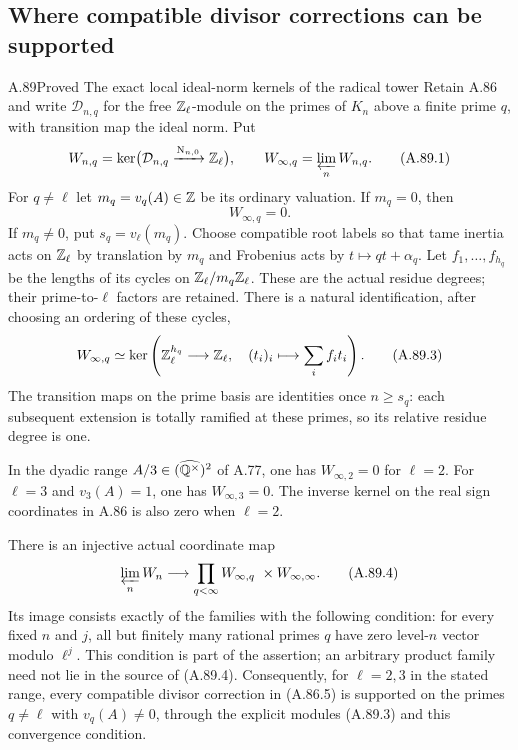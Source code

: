 \subsection{Where compatible divisor corrections can be supported}

\begin{statement}{A.89}{Proved}
{The exact local ideal-norm kernels of the radical tower}
Retain A.86 and write $\mathcal D_{n,q}$ for the free
$\mathbb Z_\ell$-module on the primes of $K_n$ above a finite prime
$q$, with transition map the ideal norm.  Put
\[
 W_{n,q}=\ker\bigl(\mathcal D_{n,q}
                                  \xrightarrow{\mathrm N_{n,0}}\mathbb Z_\ell\bigr),
 \qquad W_{\infty,q}=\varprojlim_n W_{n,q}.
 \tag{A.89.1}
\]
For $q\ne\ell$ let $m_q=v_q(A)\in\mathbb Z$ be its ordinary
valuation.  If $m_q=0$, then
\[
                                  W_{\infty,q}=0.
 \tag{A.89.2}
\]
If $m_q\ne0$, put $s_q=v_\ell(m_q)$.
Choose compatible root labels so that tame inertia acts
on $\mathbb Z_\ell$ by translation by $m_q$ and Frobenius acts
by $t\mapsto qt+\alpha_q$.
Let $f_1,\ldots,f_{h_q}$ be the lengths of its cycles on
$\mathbb Z_\ell/m_q\mathbb Z_\ell$.  These are the actual residue degrees;
their prime-to-$\ell$ factors are retained.  There is a natural
identification, after choosing an ordering of these cycles,
\[
 W_{\infty,q}\simeq
 \ker\left(\mathbb Z_\ell^{h_q}\longrightarrow\mathbb Z_\ell,
                      \quad(t_i)_i\longmapsto\sum_i f_i t_i\right).
 \tag{A.89.3}
\]
The transition maps on the prime basis are identities once
$n\ge s_q$: each subsequent extension is totally ramified
at these primes, so its relative residue degree is one.

In the dyadic range $A/3\in(\widehat{\mathbb Q^\times})^2$ of A.77,
one has $W_{\infty,2}=0$ for $\ell=2$.
For $\ell=3$ and $v_3(A)=1$, one has $W_{\infty,3}=0$.
The inverse kernel on the real sign coordinates in A.86 is
also zero when $\ell=2$.

There is an injective actual coordinate map
\[
 \varprojlim_n W_n\longrightarrow
      \prod_{q<\infty}W_{\infty,q}\ \times W_{\infty,\infty}.
 \tag{A.89.4}
\]
Its image consists exactly of the families with the following
condition: for every fixed $n$ and $j$, all but finitely many
rational primes $q$ have zero level-$n$ vector modulo $\ell^j$.
This condition is part of the assertion; an arbitrary product
family need not lie in the source of (A.89.4).
Consequently, for $\ell=2,3$ in the stated range, every compatible
divisor correction in (A.86.5) is supported on the primes
$q\ne\ell$ with $v_q(A)\ne0$, through the explicit modules
(A.89.3) and this convergence condition.
\end{statement}
